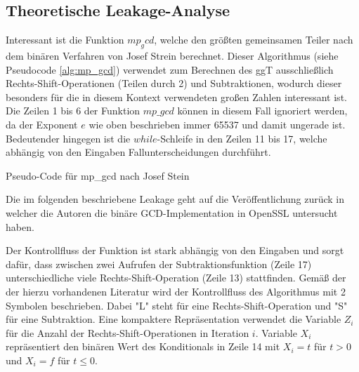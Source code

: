 \subsection{Theoretische Leakage-Analyse}

Interessant ist die Funktion $mp_gcd$, welche den größten gemeinsamen Teiler nach dem binären Verfahren von Josef Strein \cite{SteinBinaryGCD} berechnet. 
Dieser Algorithmus (siehe Pseudocode \ref{alg:mp_gcd}) verwendet zum Berechnen des ggT ausschließlich Rechts-Shift-Operationen (Teilen durch 2) und Subtraktionen, wodurch dieser besonders für die in diesem Kontext verwendeten großen Zahlen interessant ist.
Die Zeilen 1 bis 6 der Funktion $mp\_gcd$ können in diesem Fall ignoriert werden, da der Exponent $e$ wie oben beschrieben immer 65537 und damit ungerade ist. 
Bedeutender hingegen ist die $while$-Schleife in den Zeilen 11 bis 17, welche abhängig von den Eingaben Fallunterscheidungen durchführt. 

\begin{algorithm}[h]
\DontPrintSemicolon
\caption{Pseudo-Code für mp_gcd nach Josef Stein}
\label{alg:mp_gcd}

\end{algorithm}

Die im folgenden beschriebene Leakage geht auf die Veröffentlichung \cite{RSAKeyGeneration2} zurück in welcher die Autoren die binäre GCD-Implementation in OpenSSL untersucht haben.

Der Kontrollfluss der Funktion ist stark abhängig von den Eingaben und sorgt dafür, dass zwischen zwei Aufrufen der Subtraktionsfunktion (Zeile 17) unterschiedliche viele Rechts-Shift-Operation (Zeile 13) stattfinden.
Gemäß der der hierzu vorhandenen Literatur wird der Kontrollfluss des Algorithmus mit 2 Symbolen beschrieben.
Dabei "L" steht für eine Rechts-Shift-Operation und "S" für eine Subtraktion.
Eine kompaktere Repräsentation verwendet die Variable $Z_i$ für die Anzahl der Rechts-Shift-Operationen in Iteration $i$.
Variable $X_i$ repräsentiert den binären Wert des Konditionals in Zeile 14 mit $X_i=t$ für $t>0$ und $X_i = f$ für $t \leq 0$.

